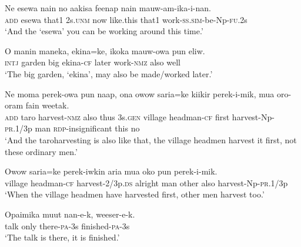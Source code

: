 \ea\label{ex:a:x31}
\gll  Ne  esewa  nain  no  aakisa  feenap  nain  mauw-am-ika-i-nan. \\
\textsc{add}  esewa  that1  2s.\textsc{unm}  now  like.this  that1  work-\textsc{ss}.\textsc{sim}-be-Np-\textsc{fu}.2s \\
\glt ‘And the ‘esewa’ you can be working around this time.’ \\
\z


\ea\label{ex:a:x32}
\gll  O  manin  maneka,  ekina=ke,  ikoka  mauw-owa  pun  eliw. \\
\textsc{intj}  garden  big  ekina-\textsc{cf}  later  work-\textsc{nmz}  also  well \\
\glt ‘The big garden, ‘ekina’, may also be made/worked later.’ \\
\z


\ea\label{ex:a:x33}
\gll  Ne  moma  perek-owa  pun  naap,  ona  owow  saria=ke  kiikir       perek-i-mik,  mua  oro-oram  fain  weetak. \\
\textsc{add}  taro  harvest-\textsc{nmz}  also  thus  3s.\textsc{gen}  village  headman-\textsc{cf}  first   harvest-Np-\textsc{pr}.1/3p  man  \textsc{rdp}-insignificant  this  no \\


\glt ‘And the taroharvesting is also like that, the village headmen harvest it first, not these ordinary men.’ \\
\z


\ea\label{ex:a:x34}
\gll  Owow  saria=ke  perek-iwkin  aria  mua  oko  pun  perek-i-mik. \\
village  headman-\textsc{cf}  harvest-2/3p.\textsc{ds}  alright  man  other  also  harvest-Np-\textsc{pr}.1/3p \\
\glt ‘When the village headmen have harvested first, other men harvest too.’ \\
\z


\ea\label{ex:a:x35}
\gll  Opaimika  muut  nan-e-k,  weeser-e-k. \\
talk  only  there-\textsc{pa}-3s  finished-\textsc{pa}-3s \\
\glt ‘The talk is there, it is finished.’ \\
\z


